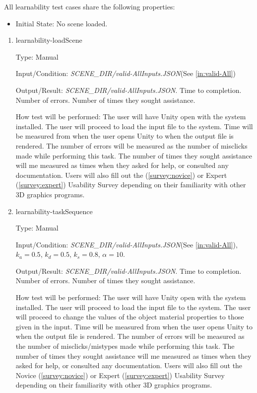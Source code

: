 \documentclass[12pt, titlepage]{article}
\begin{document}
All learnability test cases share the following properties:
\begin{itemize}
	\item[] Initial State: No scene loaded.
\end{itemize}
\begin{enumerate}
	
	\item{learnability-loadScene\\}
	
	Type: Manual
	
	Input/Condition: \textit{SCENE\_DIR/valid-AllInputs.JSON}(See 
	\ref{in:valid-All})
	
	Output/Result: \textit{SCENE\_DIR/valid-AllInputs.JSON}. Time to 
	completion. Number of errors. Number of times they sought assistance.
	
	How test will be performed: The user will have Unity open with the system 
	installed. The user will proceed to load the input file to the system. Time 
	will be measured from when the user opens Unity to when the output file is 
	rendered. The number of errors will be measured as the number of misclicks 
	made while performing this task. The number of times they sought assistance 
	will me measured as times when they asked for help, or consulted any 
	documentation. Users will also fill out the (\ref{survey:novice}) or 
	Expert (\ref{survey:expert}) Usability 
	Survey depending on their familiarity with other 3D graphics programs.

	\item{learnability-taskSequence\\}
	
	Type: Manual
	
	Input/Condition: \textit{SCENE\_DIR/valid-AllInputs.JSON}(See 
	\ref{in:valid-All}), $k_{a} = 0.5$, 
	$k_{d} = 0.5$, $k_{s} = 0.8$, $\alpha = 10$.
	
	Output/Result: \textit{SCENE\_DIR/valid-AllInputs.JSON}. Time to 
	completion. Number of errors. Number of times they sought assistance.
	
	How test will be performed: The user will have Unity open with the system 
	installed. The user will proceed to load the input file to the system. The 
	user will proceed to change the values of the object material properties to 
	those given in the input. Time will be measured from when the user opens 
	Unity to when the output file is rendered. The number of errors will be 
	measured as the number of misclicks/mistypes made while performing this 
	task. The number of times they sought assistance 
	will me measured as times when they asked for help, or consulted any 
	documentation. Users will also fill out the Novice (\ref{survey:novice}) or 
	Expert (\ref{survey:expert}) Usability Survey depending on their 
	familiarity with other 3D graphics programs.


\end{enumerate}
\end{document}

